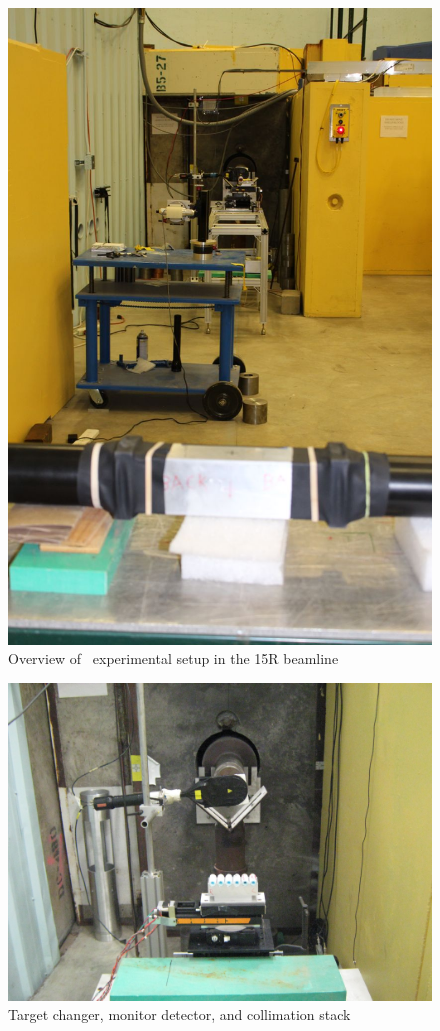 \begin{figure}
    \includegraphics[scale=0.2]{figures/UpstreamFromTOFDetector.jpg}
    \caption{Overview of \tot\ experimental setup in the 15R beamline}
    \label{BeamlineUpstream}
\end{figure}

\begin{figure}
    \includegraphics[scale=0.2]{figures/UpstreamTowardCollimator.jpg}
    \caption{Target changer, monitor detector, and collimation stack}
    \label{BeamlineTargetChanger}
\end{figure}

